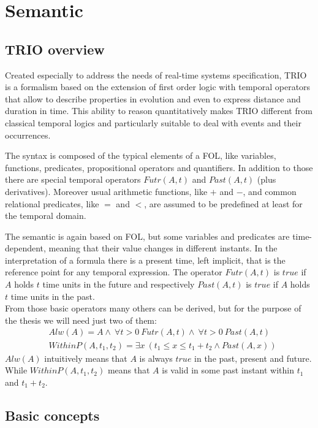 \section{Semantic}

\subsection{TRIO overview}
Created especially to address the needs of real-time systems specification, TRIO is a formalism based on the extension of first order logic with temporal operators that allow to describe properties in evolution and even to express distance and duration in time. This ability to reason quantitatively makes TRIO different from classical temporal logics and particularly suitable to deal with events and their occurrences.

The syntax is composed of the typical elements of a FOL, like variables, functions, predicates, propositional operators and quantifiers. In addition to those there are special temporal operators $Futr(A, t)$ and $Past(A, t)$ (plus derivatives). Moreover usual arithmetic functions, like $+$ and $-$, and common relational predicates, like $=$ and $<$, are assumed to be predefined at least for the temporal domain.

The semantic is again based on FOL, but some variables and predicates are time-dependent, meaning that their value changes in different instants. In the interpretation of a formula there is a present time, left implicit, that is the reference point for any temporal expression. The operator $Futr(A, t)$ is $true$ if $A$ holds $t$ time units in the future and respectively $Past(A, t)$ is $true$ if $A$ holds $t$ time units in the past.\\
From those basic operators many others can be derived, but for the purpose of the thesis we will need just two of them:
\begin{align*}
&Alw(A) = A \wedge\ \forall t > 0\ Futr(A,t) \wedge\ \forall t > 0\ Past(A, t)\\
&WithinP(A, t_1, t_2) = \exists x\ (t_1 \le x \le t_1 + t_2 \wedge Past(A,x))
\end{align*}
$Alw(A)$ intuitively means that $A$ is always $true$ in the past, present and future. While $WithinP(A, t_1, t_2)$ means that $A$ is valid in some past instant within $t_1$ and $t_1 + t_2$.

\subsection{Basic concepts}
